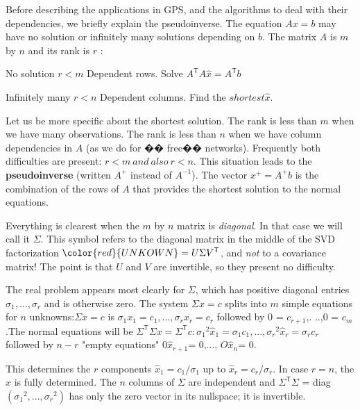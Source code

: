 \par
Before describing the applications in GPS, and the algorithms to deal with their dependencies, we briefly explain the pseudoinverse. The equation $Ax = b$ may have no solution or infinitely many solutions depending on $b$. The matrix $A$ is $m$ by $n$ and its rank is $r$ :
\par
\begin{center}
	No solution \qquad $r < m$ \qquad Dependent rows.   Solve $A^\mathsf{T}A\hat{x} = A^\mathsf{T}b$
	\par
	Infinitely many \qquad  $r < n$ \qquad Dependent columns.  Find the $shortest \hat{x}$.
\end{center}
\par
Let us be more specific about the shortest solution. The rank is less than $m$ when we have many observations. The rank is less than $n$ when we have column dependencies in $A$ (as we do for �� free�� networks). Frequently both difficulties are present: $r < m\ and\ also\ r < n$. This situation leads to the \textbf{pseudoinverse} (written ${A}^+$ instead of ${A}^{-1}$). The vector ${x}^+ = {A}^+b$  is the combination of the rows of $A$ that provides the shortest solution to the normal equations.
\par
Everything is clearest when the $m$ by $n$ matrix is \emph{diagonal}. In that case we will call it $\Sigma$. This symbol refers to the diagonal matrix in the middle of the SVD factorization ${\color{red}{UNKOWN}} =U\Sigma V^\mathsf{T}$, and \emph{not} to a covariance matrix! The point is that $U$ and $V$ are invertible, so they present no difficulty.
\par
The real problem appears most clearly for $\Sigma$, which has positive diagonal entries $\sigma_1,...,\sigma_r$ and is otherwise zero. The system $\Sigma x = c$ splits into $m$ simple equations for $n$ unknowns:$\Sigma x = c$ is $\sigma_1{x_1}=c_1,...,\sigma_r{x_r}=c_r$ followed by 0 = $c_{r+1}$,. ..,0 = $c_m$.The normal equations will be $\Sigma^{\mathsf{T}}\Sigma x=\Sigma^\mathsf{T}c: {\sigma_1}^2{{\hat{x}}_1}={\sigma_1}{c_1},...,{\sigma_r}^2{{\hat{x}}_r}={\sigma_r}{c_r}$ followed by $n - r$ "empty equations" $0{\hat{x}}_{r+1}$= 0,..., $O{\hat{x}}_{n}$= 0.
\par
This determines the $r$ components ${\hat{x}}_{1} = c_1/\sigma_1$ up to ${\hat{x}}_{r} = c_r/\sigma_r$. In case $r = n$, the ${\hat{x}}$ is fully determined. The $n$ columns of $\Sigma$ are independent and $\Sigma^\mathsf{T}\Sigma$ = diag$({\sigma_1}^2,...,{\sigma_r}^2)$ has only the zero vector in its nullspace; it is invertible.

